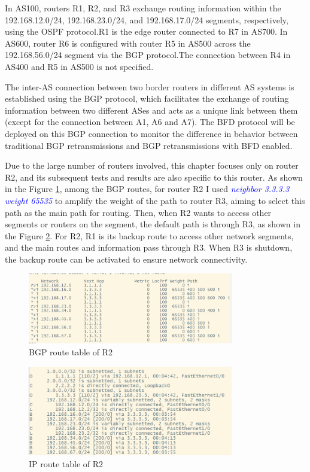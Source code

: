 \documentclass[12pt]{article}
\begin{document}
In AS100, routers R1, R2, and R3 exchange routing information within the 192.168.12.0/24, 192.168.23.0/24, and 192.168.17.0/24 segments, respectively, using the OSPF protocol.R1 is the edge router connected to R7 in AS700. In AS600, router R6 is configured with router R5 in AS500 across the 192.168.56.0/24 segment via the BGP protocol.The connection between R4 in AS400 and R5 in AS500 is not specified.

The inter-AS connection between two border routers in different AS systems is established using the BGP protocol, which facilitates the exchange of routing information between two different ASes and acts as a unique link between them (except for the connection between A1, A6 and A7). The BFD protocol will be deployed on this BGP connection to monitor the difference in behavior between traditional BGP retransmissions and BGP retransmissions with BFD enabled.

Due to the large number of routers involved, this chapter focuses only on router R2, and its subsequent tests and results are also specific to this router. As shown in the Figure \ref{fig:BGProute}, among the BGP routes, for router R2 I used \textcolor{blue}{\textit{neighbor 3.3.3.3 weight 65535}} to amplify the weight of the path to router R3, aiming to select this path as the main path for routing. Then, when R2 wants to access other segments or routers on the segment, the default path is through R3, as shown in the Figure \ref{fig:IProute}. For R2, R1 is its backup route to access other network segments, and the main routes and information pass through R3. When R3 is shutdown, the backup route can be activated to ensure network connectivity.

\begin{figure}[h]
    \centering
    \includegraphics[width=0.8\textwidth,keepaspectratio]{Graph/BGProute.png}
    \caption{BGP route table of R2} 
    \label{fig:BGProute} 
\end{figure}

\begin{figure}[h]
    \centering
    \includegraphics[width=0.8\textwidth,keepaspectratio]{Graph/IProute.png}
    \caption{IP route table of R2} 
    \label{fig:IProute} 
\end{figure}
\end{document}
